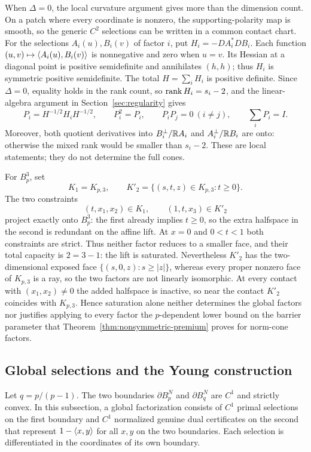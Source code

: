 When $\Delta=0$, the local curvature argument gives more than the
dimension count.
On a patch where every coordinate is nonzero, the supporting-polarity map
is smooth, so the generic $C^2$ selections can be written in a common
contact chart. For the selections $A_i(u),B_i(v)$ of factor $i$, put $H_i=-DA_i^*DB_i$. Each function
$(u,v)\mapsto\langle A_i(u),B_i(v)\rangle$ is nonnegative and zero when $u=v$. Its Hessian
at a diagonal point is positive semidefinite and annihilates $(h,h)$;
thus $H_i$ is symmetric positive semidefinite. The total
$H=\sum_iH_i$ is positive definite. Since $\Delta=0$, equality holds in
the rank count, so $\operatorname{rank} H_i=s_i-2$, and the linear-algebra argument in
Section~\ref{sec:regularity} gives
\begin{equation}\label{eq:lp-local-projections}
 P_i=H^{-1/2}H_iH^{-1/2},\qquad
 P_i^2=P_i,\qquad P_iP_j=0\ (i\ne j),\qquad \sum_iP_i=I.
\end{equation}
Moreover, both quotient derivatives into
$B_i^\perp/\mathbb R A_i$ and $A_i^\perp/\mathbb R B_i$ are onto: otherwise the
mixed rank would be smaller than $s_i-2$. These are local statements;
they do not determine the full cones.

\begin{example}
\label{ex:lp-halfcone}
For $B_p^3$, set
\[
 K_1=K_{p,3},\qquad
 K'_2=\{(s,t,z)\in K_{p,3}:t\geq0\}.
\]
The two constraints
\[
 (t,x_1,x_2)\in K_1,\qquad (1,t,x_3)\in K'_2
\]
project exactly onto $B_p^3$: the first already implies $t\geq0$, so
the extra halfspace in the second is redundant on the affine lift.
At $x=0$ and $0<t<1$ both constraints are strict. Thus neither factor
reduces to a smaller face, and their total capacity is $2=3-1$: the
lift is saturated. Nevertheless $K'_2$ has the
two-dimensional exposed face
$\{(s,0,z):s\geq|z|\}$, whereas every proper nonzero face of $K_{p,3}$
is a ray, so the two factors are not linearly isomorphic. At every contact
with $(x_1,x_2)\ne0$ the added halfspace is inactive, so near the
contact $K'_2$ coincides with $K_{p,3}$. Hence saturation alone neither determines the global
factors nor justifies applying to every factor the $p$-dependent lower bound
on the barrier parameter that Theorem~\ref{thm:nonsymmetric-premium}
proves for norm-cone factors.
\end{example}

\subsection{Global selections and the Young construction}
Let $q=p/(p-1)$. The two boundaries $\partial B_p^N$ and
$\partial B_q^N$ are $C^1$ and strictly convex. In this subsection, a
global factorization consists of $C^1$ primal selections on the first
boundary and $C^1$ normalized genuine dual certificates on the second
that represent $1-\langle x,y\rangle$ for all $x,y$ on the two boundaries. Each
selection is differentiated in the coordinates
of its own boundary.

